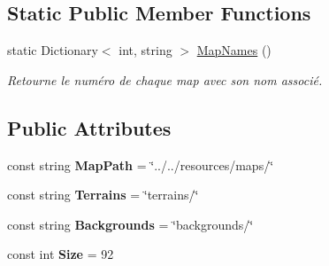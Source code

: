 \subsection*{Static Public Member Functions}
\begin{DoxyCompactItemize}
\item 
static Dictionary$<$ int, string $>$ \hyperlink{class_tentacle_slicers_1_1maps_1_1_map_a2d27d0e714bd8f4874281cbed81af861}{Map\+Names} ()
\begin{DoxyCompactList}\small\item\em Retourne le numéro de chaque map avec son nom associé. \end{DoxyCompactList}\end{DoxyCompactItemize}
\subsection*{Public Attributes}
\begin{DoxyCompactItemize}
\item 
\mbox{\label{class_tentacle_slicers_1_1maps_1_1_map_a0e9ad627c470f164e6db9caa5a46aa71}} 
const string {\bfseries Map\+Path} = \char`\"{}../../resources/maps/\char`\"{}
\item 
\mbox{\label{class_tentacle_slicers_1_1maps_1_1_map_a20bcc2da6af3fa02d1489c12d517a3b4}} 
const string {\bfseries Terrains} = \char`\"{}terrains/\char`\"{}
\item 
\mbox{\label{class_tentacle_slicers_1_1maps_1_1_map_a90e099af009c1c90b3e127830df83765}} 
const string {\bfseries Backgrounds} = \char`\"{}backgrounds/\char`\"{}
\item 
\mbox{\label{class_tentacle_slicers_1_1maps_1_1_map_adc74fb3b3b997c5985c35653602bef94}} 
const int {\bfseries Size} = 92
\end{DoxyCompactItemize}
